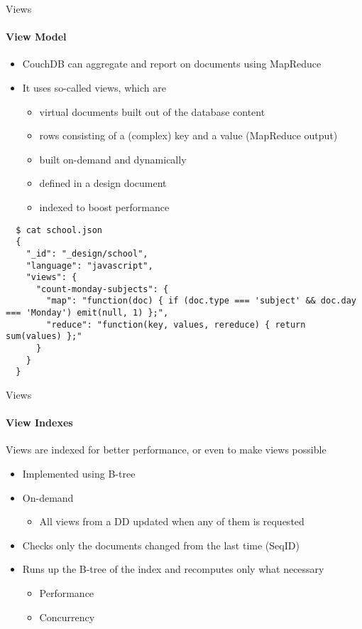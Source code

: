 \documentclass{beamer}
\begin{document}
\begin{frame}[fragile]{Views}
  \framesubtitle{View Model}
  \begin{itemize}
    \item CouchDB can aggregate and report on documents using MapReduce
    \item It uses so-called views, which are 
    \begin{itemize}
      \item virtual documents built out of the database content
      \item rows consisting of a (complex) key and a value (MapReduce output)
      \item built on-demand and dynamically
      \item defined in a design document
      \item indexed to boost performance
    \end{itemize}
  \end{itemize}
  \fontsize{6}{8}\selectfont
  \begin{verbatim}
  $ cat school.json 
  {
    "_id": "_design/school",
    "language": "javascript",
    "views": {
      "count-monday-subjects": {
        "map": "function(doc) { if (doc.type === 'subject' && doc.day === 'Monday') emit(null, 1) };",
        "reduce": "function(key, values, rereduce) { return sum(values) };"
      }
    }
  }
  \end{verbatim}
\end{frame}

\begin{frame}{Views}
  \framesubtitle{View Indexes}
  Views are indexed for better performance, or even to make views possible
  \begin{itemize}
    \item Implemented using B-tree
    \item On-demand
    \begin{itemize}
      \item All views from a DD updated when any of them is requested
    \end{itemize}
    \item Checks only the documents changed from the last time (SeqID)
    \item Runs up the B-tree of the index and recomputes only what necessary
    \begin{itemize}
      \item Performance
      \item Concurrency
    \end{itemize}
  \end{itemize}
\end{frame}
\end{document}
